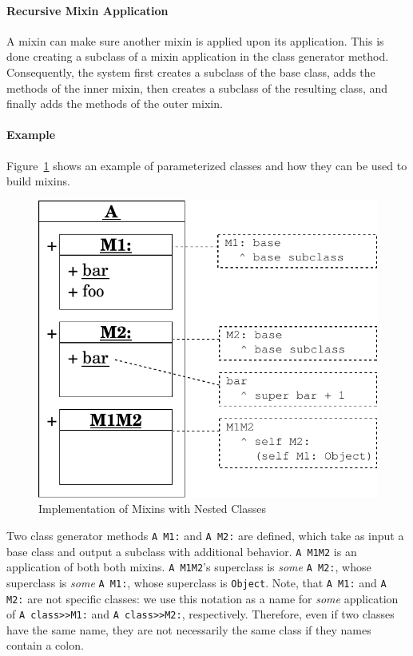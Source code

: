 \paragraph{Recursive Mixin Application}
A mixin can make sure another mixin is applied upon its application. This is done creating a subclass of a mixin application in the class generator method. Consequently, the system first creates a subclass of the base class, adds the methods of the inner mixin, then creates a subclass of the resulting class, and finally adds the methods of the outer mixin.

\paragraph{Example}
Figure~\ref{fig:concept_mixins} shows an example of parameterized classes and how they can be used to build mixins.

\begin{figure}[!htp]
    \centering
    \includegraphics[scale=0.75]{nested_mixins.pdf}
    \caption{Implementation of Mixins with Nested Classes}
    \label{fig:concept_mixins}
\end{figure}

Two class generator methods \texttt{A M1:} and \texttt{A M2:} are defined, which take as input a base class and output a subclass with additional behavior. \texttt{A M1M2} is an application of both both mixins. \texttt{A M1M2}'s superclass is \emph{some} \texttt{A M2:}, whose superclass is \emph{some} \texttt{A M1:}, whose superclass is \texttt{Object}. Note, that \texttt{A M1:} and \texttt{A M2:} are not specific classes: we use this notation as a name for \emph{some} application of \texttt{A class>>M1:} and \texttt{A class>>M2:}, respectively. Therefore, even if two classes have the same name, they are not necessarily the same class if they names contain a colon.

